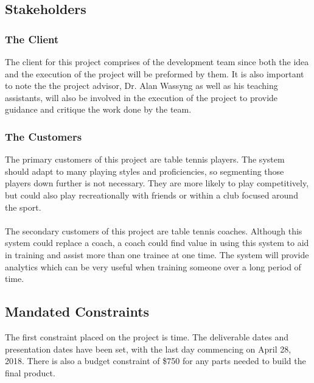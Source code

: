 \documentclass[11pt]{article}
\begin{document}
\subsection{Stakeholders}
\subsubsection{The Client}
The client for this project comprises of the development team since both the idea and the execution of the project will be preformed by them. It is also important to note the the project advisor, Dr. Alan Wassyng as well as his teaching assistants, will also be involved in the execution of the project to provide guidance and critique the work done by the team.
\subsubsection{The Customers}
The primary customers of this project are table tennis players. The system should adapt to many playing styles and proficiencies, so segmenting those players down further is not necessary. They are more likely to play competitively, but could also play recreationally with friends or within a club focused around the sport. \\\\
The secondary customers of this project are table tennis coaches. Although this system could replace a coach, a coach could find value in using this system to aid in training and assist more than one trainee at one time. The system will provide analytics which can be very useful when training someone over a long period of time.
\subsection{Mandated Constraints}
The first constraint placed on the project is time. The deliverable dates and presentation dates have been set, with the last day commencing on April 28, 2018. There is also a budget constraint of \$750 for any parts needed to build the final product.
\end{document}
